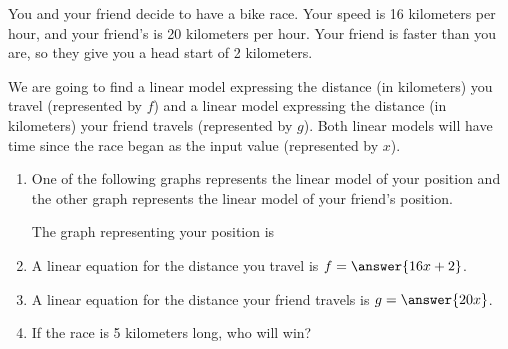 \documentclass{ximera}
\author{Kenneth Berglund}
\begin{document}
\begin{exercise}

You and your friend decide to have a bike race. Your speed is 16 kilometers per hour, and your friend's is 20 kilometers per hour. Your friend is faster than you are, so they give you a head start of 2 kilometers.

We are going to find a linear model expressing the distance (in kilometers) you travel (represented by $f$) and a linear model expressing the distance (in kilometers) your friend travels (represented by $g$). Both linear models will have time since the race began as the input value (represented by $x$).

\begin{enumerate}
\item One of the following graphs represents the linear model of your position and the other graph represents the linear model of your friend's position.


\begin{image}
\end{image}


The graph representing your position is
\begin{multipleChoice}
\end{multipleChoice}


\item A linear equation for the distance you travel is $f = \answer{16x + 2}$.

\item A linear equation for the distance your friend travels is $g = \answer{20x}$.

\item If the race is 5 kilometers long, who will win?
\begin{multipleChoice}
\end{multipleChoice}


\end{enumerate}
\end{exercise}
\end{document}
